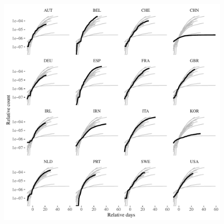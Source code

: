 \documentclass[fullpage,a4paper]{article}
\begin{document}
\begin{figure}
  \includegraphics[width=1\textwidth]{../figs/ecdc_aligned_onepermill_nyt.pdf}
  \caption{\label{fig:align_nyt}}
\end{figure}
\end{document}
